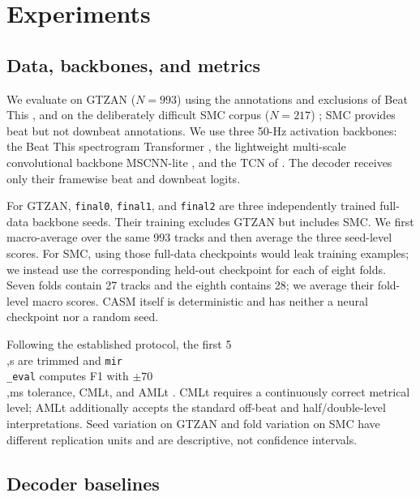 \documentclass{article}
\begin{document}
\section{Experiments}
\label{sec:exp}

\subsection{Data, backbones, and metrics}

We evaluate on GTZAN ($N=993$) using the annotations and exclusions of Beat This \cite{foscarin2024beat}, and on the deliberately difficult SMC corpus ($N=217$) \cite{smc}; SMC provides beat but not downbeat annotations. We use three 50-Hz activation backbones: the Beat This spectrogram Transformer \cite{foscarin2024beat}, the lightweight multi-scale convolutional backbone MSCNN-lite \cite{he2026dynest}, and the TCN of \cite{bock2020deconstruct}. The decoder receives only their framewise beat and downbeat logits.

For GTZAN, \texttt{final0}, \texttt{final1}, and \texttt{final2} are three independently trained full-data backbone seeds. Their training excludes GTZAN but includes SMC. We first macro-average over the same 993 tracks and then average the three seed-level scores. For SMC, using those full-data checkpoints would leak training examples; we instead use the corresponding held-out checkpoint for each of eight folds. Seven folds contain 27 tracks and the eighth contains 28; we average their fold-level macro scores. CASM itself is deterministic and has neither a neural checkpoint nor a random seed.

Following the established protocol, the first 5\\,s are trimmed and \texttt{mir\\\_eval} computes F1 with $\pm70$\\,ms tolerance, CMLt, and AMLt \cite{raffel2014mireval}. CMLt requires a continuously correct metrical level; AMLt additionally accepts the standard off-beat and half/double-level interpretations. Seed variation on GTZAN and fold variation on SMC have different replication units and are descriptive, not confidence intervals.

\subsection{Decoder baselines}
\end{document}
